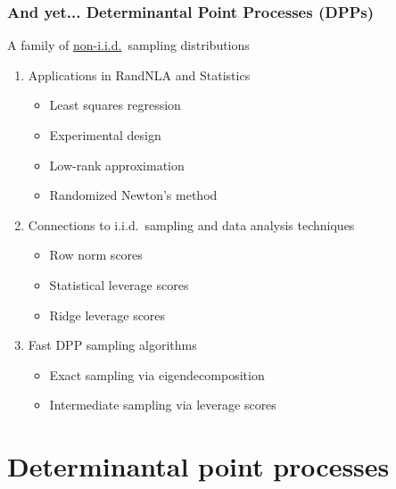 \documentclass{beamer}
\begin{document}
  \begin{frame}
    \frametitle{And yet... Determinantal Point Processes (DPPs)}
A family of \underline{non-i.i.d.}~sampling distributions\pause
    
    \begin{enumerate}
    \item Applications in RandNLA and Statistics\pause
      \begin{itemize}
      \item Least squares regression
        \cite{unbiased-estimates,leveraged-volume-sampling}\pause
        \item Experimental design \cite{minimax-experimental-design,bayesian-experimental-design}\pause
      \item Low-rank approximation
        \cite{pca-volume-sampling,more-efficient-volume-sampling,nystrom-multiple-descent}\pause
        \item Randomized Newton's method \cite{determinantal-averaging,randomized-newton}
        \end{itemize}\pause
      \item Connections to i.i.d.~sampling and data analysis techniques\pause
        \begin{itemize}
        \item Row norm scores\pause
        \item Statistical leverage scores\pause
        \item Ridge leverage scores\pause
        \end{itemize}
      \item Fast DPP sampling algorithms\pause
        \begin{itemize}
        \item Exact sampling via eigendecomposition \cite{dpp-independence,k-dpp}\pause
        \item Intermediate sampling via leverage scores
          \cite{dpp-intermediate,dpp-sublinear}
        \end{itemize}
    \end{enumerate}
  \end{frame}

\section{Determinantal point processes}
  
\end{document}
